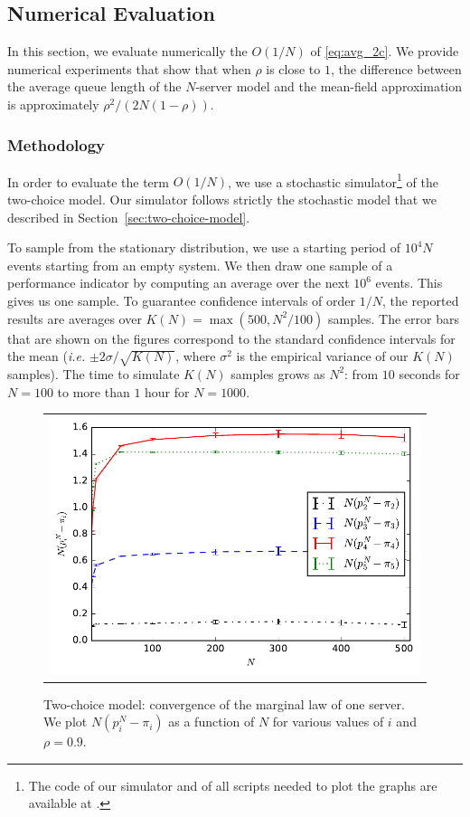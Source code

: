 \documentclass[sigconf]{acmart}
\begin{document}
\subsection{Numerical Evaluation}

In this section, we evaluate numerically the $O(1/N)$ of
\eqref{eq:avg_2c}. We provide numerical experiments that show that
when $\rho$ is close to $1$, the difference between the average queue
length of the $N$-server model and the mean-field approximation is
approximately $\rho^2/(2N(1-\rho))$.

\subsubsection{Methodology}

In order to evaluate the term $O(1/N)$, we use a stochastic
simulator\footnote{The code of our simulator and of all scripts needed
  to plot the graphs are available at \githublink.} of the two-choice
model. Our simulator follows strictly the stochastic model that we
described in Section~\ref{sec:two-choice-model}.

To sample from the stationary distribution, we use a starting period
of $10^4N$ events starting from an empty system. We then draw one
sample of a performance indicator by computing an average over the
next $10^6$ events. This gives us one sample. To guarantee confidence
intervals of order $1/N$, the reported results are averages over
$K(N)=\max(500,N^2/100)$ samples. The error bars that are shown on the
figures correspond to the standard confidence intervals for the mean
(\emph{i.e.} $\pm2\sigma/\sqrt{K(N)}$, where $\sigma^2$ is the
empirical variance of our $K(N)$ samples).  The time to simulate
$K(N)$ samples grows as $N^2$: from $10$ seconds for $N=100$ to more
than $1$ hour for $N=1000$.



\begin{figure}[t]
  \centering
  \begin{tabular}{@{}c@{}}
    \includegraphics[width=0.90\linewidth]{2choice_convergence_rho90}\\
  \end{tabular}
  \caption{Two-choice model: convergence of the marginal law of one
    server. We plot $N(p^N_i-\pi_i)$ as a function of $N$ for various
    values of $i$ and $\rho=0.9$. }
  \label{fig:2-choice_x}
\end{figure}
\end{document}
